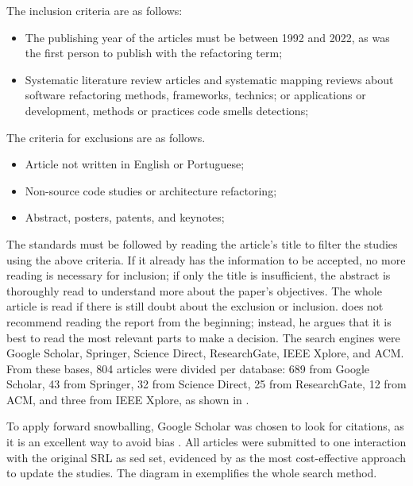 The inclusion criteria are as follows:

\begin{itemize}
    \item The publishing year of the articles must be between 1992 and 2022, as \textcite{Opdyke1992} was the first person to publish with the refactoring term;
    \item Systematic literature review articles and systematic mapping reviews about software refactoring methods, frameworks, technics; or applications or development, methods or practices code smells detections;
\end{itemize}

The criteria for exclusions are as follows.

\begin{itemize}
    \item Article not written in English or Portuguese;
    \item Non-source code studies or architecture refactoring;
    \item Abstract, posters, patents, and keynotes;
\end{itemize}

The standards must be followed by reading the article's title to filter the studies using the above criteria. If it already has the information to be accepted, no more reading is necessary for inclusion; if only the title is insufficient, the abstract is thoroughly read to understand more about the paper's objectives. The whole article is read if there is still doubt about the exclusion or inclusion. \textcite{Wohlin2014} does not recommend reading the report from the beginning; instead, he argues that it is best to read the most relevant parts to make a decision.
The search engines were Google Scholar, Springer, Science Direct, ResearchGate, IEEE Xplore, and ACM. From these bases, 804 articles were divided per database: 689 from Google Scholar, 43 from Springer, 32 from Science Direct, 25 from ResearchGate, 12 from ACM, and three from IEEE Xplore, as shown in .

To apply forward snowballing, Google Scholar was chosen to look for citations, as it is an excellent way to avoid bias \cite{Wohlin2014}. All articles were submitted to one interaction with the original SRL as sed set, evidenced by \textcite{Wohlin2020} as the most cost-effective approach to update the studies. The diagram in  exemplifies the whole search method. 

